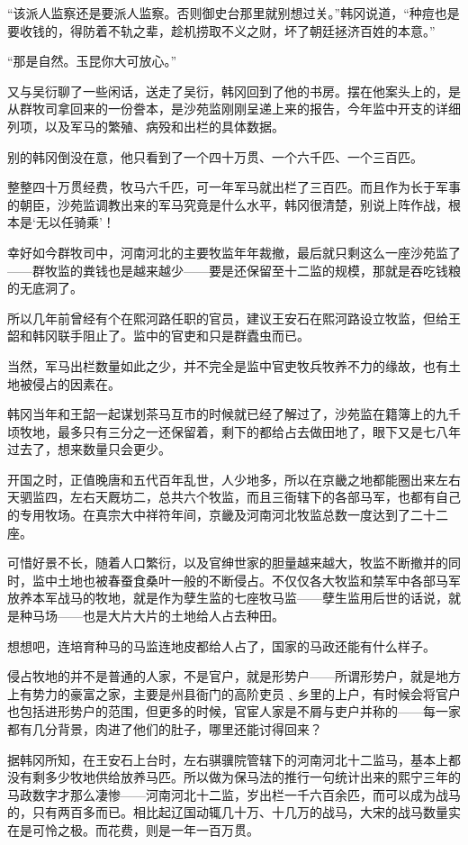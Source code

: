 “该派人监察还是要派人监察。否则御史台那里就别想过关。”韩冈说道，“种痘也是要收钱的，得防着不轨之辈，趁机捞取不义之财，坏了朝廷拯济百姓的本意。”

“那是自然。玉昆你大可放心。”

又与吴衍聊了一些闲话，送走了吴衍，韩冈回到了他的书房。摆在他案头上的，是从群牧司拿回来的一份誊本，是沙苑监刚刚呈递上来的报告，今年监中开支的详细列项，以及军马的繁殖、病殁和出栏的具体数据。

别的韩冈倒没在意，他只看到了一个四十万贯、一个六千匹、一个三百匹。

整整四十万贯经费，牧马六千匹，可一年军马就出栏了三百匹。而且作为长于军事的朝臣，沙苑监调教出来的军马究竟是什么水平，韩冈很清楚，别说上阵作战，根本是‘无以任骑乘’！

幸好如今群牧司中，河南河北的主要牧监年年裁撤，最后就只剩这么一座沙苑监了——群牧监的粪钱也是越来越少——要是还保留至十二监的规模，那就是吞吃钱粮的无底洞了。

所以几年前曾经有个在熙河路任职的官员，建议王安石在熙河路设立牧监，但给王韶和韩冈联手阻止了。监中的官吏和只是群蠹虫而已。

当然，军马出栏数量如此之少，并不完全是监中官吏牧兵牧养不力的缘故，也有土地被侵占的因素在。

韩冈当年和王韶一起谋划茶马互市的时候就已经了解过了，沙苑监在籍簿上的九千顷牧地，最多只有三分之一还保留着，剩下的都给占去做田地了，眼下又是七八年过去了，想来数量只会更少。

开国之时，正值晚唐和五代百年乱世，人少地多，所以在京畿之地都能圈出来左右天驷监四，左右天厩坊二，总共六个牧监，而且三衙辖下的各部马军，也都有自己的专用牧场。在真宗大中祥符年间，京畿及河南河北牧监总数一度达到了二十二座。

可惜好景不长，随着人口繁衍，以及官绅世家的胆量越来越大，牧监不断撤并的同时，监中土地也被春蚕食桑叶一般的不断侵占。不仅仅各大牧监和禁军中各部马军放养本军战马的牧地，就是作为孽生监的七座牧马监——孽生监用后世的话说，就是种马场——也是大片大片的土地给人占去种田。

想想吧，连培育种马的马监连地皮都给人占了，国家的马政还能有什么样子。

侵占牧地的并不是普通的人家，不是官户，就是形势户——所谓形势户，就是地方上有势力的豪富之家，主要是州县衙门的高阶吏员﹑乡里的上户，有时候会将官户也包括进形势户的范围，但更多的时候，官宦人家是不屑与吏户并称的——每一家都有几分背景，肉进了他们的肚子，哪里还能讨得回来？

据韩冈所知，在王安石上台时，左右骐骥院管辖下的河南河北十二监马，基本上都没有剩多少牧地供给放养马匹。所以做为保马法的推行一句统计出来的熙宁三年的马政数字才那么凄惨——河南河北十二监，岁出栏一千六百余匹，而可以成为战马的，只有两百多而已。相比起辽国动辄几十万、十几万的战马，大宋的战马数量实在是可怜之极。而花费，则是一年一百万贯。

